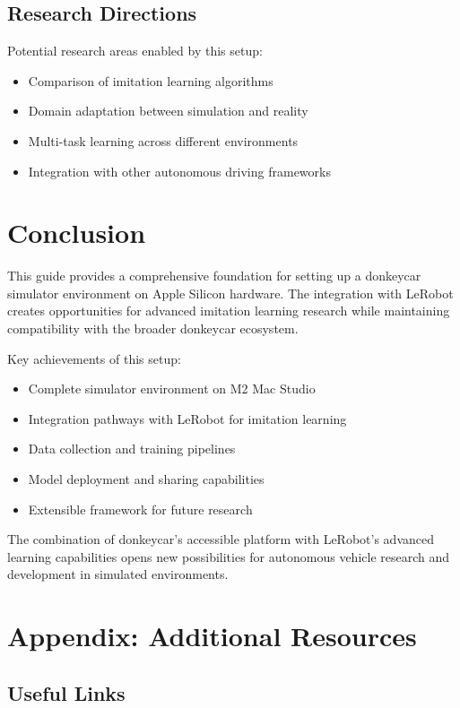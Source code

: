 \documentclass[11pt,a4paper]{article}
\begin{document}
\subsection{Research Directions}

Potential research areas enabled by this setup:

\begin{itemize}
    \item Comparison of imitation learning algorithms
    \item Domain adaptation between simulation and reality
    \item Multi-task learning across different environments
    \item Integration with other autonomous driving frameworks
\end{itemize}

\section{Conclusion}

This guide provides a comprehensive foundation for setting up a donkeycar simulator environment on Apple Silicon hardware. The integration with LeRobot creates opportunities for advanced imitation learning research while maintaining compatibility with the broader donkeycar ecosystem.

Key achievements of this setup:
\begin{itemize}
    \item Complete simulator environment on M2 Mac Studio
    \item Integration pathways with LeRobot for imitation learning
    \item Data collection and training pipelines
    \item Model deployment and sharing capabilities
    \item Extensible framework for future research
\end{itemize}

The combination of donkeycar's accessible platform with LeRobot's advanced learning capabilities opens new possibilities for autonomous vehicle research and development in simulated environments.

\section{Appendix: Additional Resources}

\subsection{Useful Links}
\end{document}

